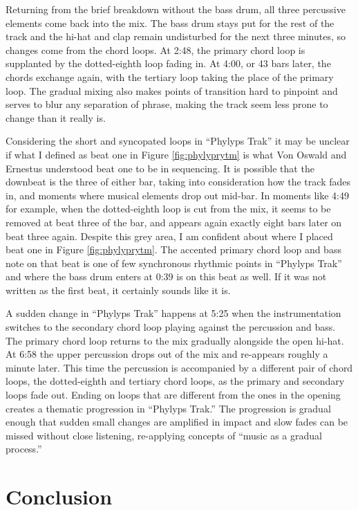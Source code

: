 \documentclass[12pt,twoside]{reedthesis}
\begin{document}
Returning from the brief breakdown without the bass drum, all three percussive elements come back into the mix. The bass drum stays put for the rest of the track and the hi-hat and clap remain undisturbed for the next three minutes, so changes come from the chord loops. At 2:48, the primary chord loop is supplanted by the dotted-eighth loop fading in. At 4:00, or 43 bars later, the chords exchange again, with the tertiary loop taking the place of the primary loop. The gradual mixing also makes points of transition hard to pinpoint and serves to blur any separation of phrase, making the track seem less prone to change than it really is.

Considering the short and syncopated loops in ``Phylyps Trak'' it may be unclear if what I defined as beat one in Figure \ref{fig:phylyprytm} is what Von Oswald and Ernestus understood beat one to be in sequencing. It is possible that the downbeat is the three of either bar, taking into consideration how the track fades in, and moments where musical elements drop out mid-bar. In moments like 4:49 for example, when the dotted-eighth loop is cut from the mix, it seems to be removed at beat three of the bar, and appears again exactly eight bars later on beat three again. Despite this grey area, I am confident about where I placed beat one in Figure \ref{fig:phylyprytm}. The accented primary chord loop and bass note on that beat is one of few synchronous rhythmic points in ``Phylyps Trak'' and where the bass drum enters at 0:39 is on this beat as well. If it was not written as the first beat, it certainly sounds like it is.

A sudden change in ``Phylyps Trak'' happens at 5:25 when the instrumentation switches to the secondary chord loop playing against the percussion and bass. The primary chord loop returns to the mix gradually alongside the open hi-hat. At 6:58 the upper percussion drops out of the mix and re-appears roughly a minute later. This time the percussion is accompanied by a different pair of chord loops, the dotted-eighth and tertiary chord loops, as the primary and secondary loops fade out. Ending on loops that are different from the ones in the opening creates a thematic progression in ``Phylyps Trak.'' The progression is gradual enough that sudden small changes are amplified in impact and slow fades can be missed without close listening, re-applying concepts of ``music as a gradual process.''

\section{Conclusion}
\end{document}
